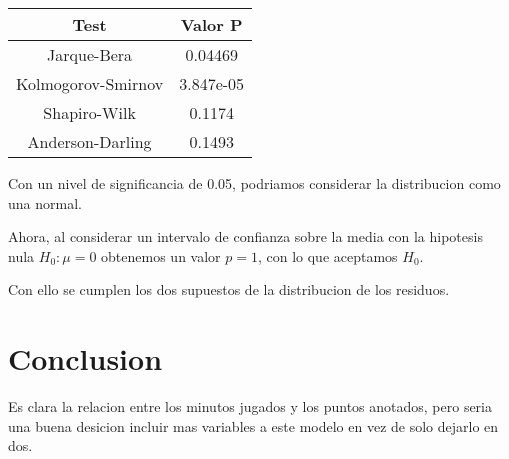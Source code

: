 \documentclass{IEEEtran}
\begin{document}
    \begin{table}[h]
        \begin{center}
            \begin{tabular}{|c|c|}
                \hline Test & Valor P \\ \hline
                Jarque-Bera & 0.04469 \\ \hline
                Kolmogorov-Smirnov & 3.847e-05\\ \hline
                Shapiro-Wilk & 0.1174 \\ \hline
                Anderson-Darling & 0.1493 \\ \hline
            \end{tabular}
        \end{center}
    \end{table}

    Con un nivel de significancia de 0.05, podriamos considerar la distribucion como una normal.

    Ahora, al considerar un intervalo de confianza sobre la media con la hipotesis nula $H_0: \mu = 0$ obtenemos un valor $p = 1$, con lo que aceptamos $H_0$.

    Con ello se cumplen los dos supuestos de la distribucion de los residuos.

    \section{Conclusion}
    Es clara la relacion entre los minutos jugados y los puntos anotados, pero seria una buena desicion incluir mas variables a este modelo en vez de solo dejarlo en dos.
\end{document}
